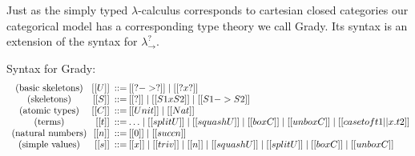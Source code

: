 Just as the simply typed $\lambda$-calculus corresponds to cartesian
closed categories our categorical model has a corresponding type
theory we call Grady.  Its syntax is an extension of the syntax for
$\lambda^?_\to$.

\begin{definition}
  \label{def:grady-syntax}
  Syntax for Grady:
  \[
  \begin{array}{c@{\hspace{5pt}}r@{}@{\hspace{5pt}}r@{}@{\hspace{2pt}}l@{}llllllllllll}
    \text{(basic skeletons)} & [[U]] & ::= & [[? -> ?]] \mid [[? x ?]]\\
    \text{(skeletons)}       & [[S]] & ::= & [[?]] \mid [[S1 x S2]] \mid [[S1 -> S2]]\\
    \text{(atomic types)}    & [[C]] & ::= & [[Unit]] \mid [[Nat]]\\
    \text{(terms)}           & [[t]] & ::= & \ldots \mid [[split U]] \mid [[squash U]] \mid [[box C]] \mid [[unbox C]] \mid [[case t of t1 || x.t2]]\\
    \text{(natural numbers)} & [[n]] & ::= & [[0]] \mid [[succ n]]\\
    \text{(simple values)}   & [[s]] & ::= & [[x]] \mid [[triv]] \mid [[n]] \mid [[squash U]] \mid [[split U]] \mid [[box C]] \mid [[unbox C]]\\   
  \end{array}
  \]
\end{definition}


